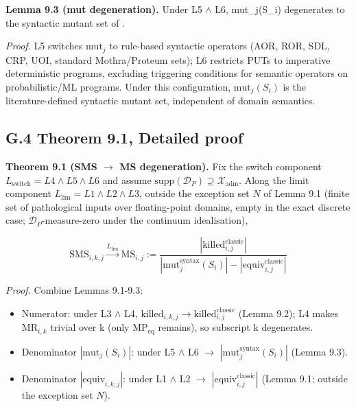 \documentclass[manuscript,screen,review]{acmart}
\begin{document}
\textbf{Lemma 9.3 (mut degeneration).} Under L5 $\wedge$ L6, mut\_j(S\_i)
degenerates to the syntactic mutant set of \citet{d7c38286734419b52de4262c9802ebdfcf4b9447}.

\emph{Proof.} L5 switches $\mathrm{mut}_j$ to rule-based syntactic operators (AOR,
ROR, SDL, CRP, UOI, standard Mothra/Proteum sets); L6 restricts PUTs
to imperative deterministic programs, excluding triggering conditions
for semantic operators on probabilistic/ML programs. Under this
configuration, $\mathrm{mut}_j(S_i)$ is the literature-defined syntactic mutant
set, independent of domain semantics.

\subsection{G.4 Theorem 9.1, Detailed proof}\label{g.4-theorem-9.1-detailed-proof}

\textbf{Theorem 9.1 (SMS $\to$ MS degeneration).} Fix the switch
component $L_{\mathrm{switch}} = L4 \wedge L5 \wedge L6$ and assume
$\mathrm{supp}(\mathcal{D}_P) \supseteq \mathcal{X}_{\mathrm{adm}}$.
Along the limit component $L_{\mathrm{lim}} = L1 \wedge L2 \wedge L3$,
outside the exception set $N$ of Lemma 9.1 (finite set of pathological
inputs over floating-point domains, empty in the exact discrete case;
$\mathcal{D}_P$-measure-zero under the continuum idealisation),

\[ \mathrm{SMS}_{i,k,j} \xrightarrow{L_{\mathrm{lim}}} \mathrm{MS}_{i,j} := \frac{|\mathrm{killed}_{i,j}^{\mathrm{classic}}|}{|\mathrm{mut}_j^{\mathrm{syntax}}(S_i)| - |\mathrm{equiv}_{i,j}^{\mathrm{classic}}|} \]

\emph{Proof.} Combine Lemmas 9.1-9.3:

\begin{itemize}

\item
  Numerator: under L3 $\wedge$ L4, $\mathrm{killed}_{i,k,j} \to
  \mathrm{killed}_{i,j}^{\mathrm{classic}}$ (Lemma 9.2); L4 makes $\mathrm{MR}_{i,k}$ trivial
  over k (only $\mathrm{MP}_{\mathrm{eq}}$ remains), so subscript k degenerates.
\item
  Denominator $|\mathrm{mut}_j(S_i)|$: under L5 $\wedge$ L6 $\to$
  $|\mathrm{mut}_j^{\mathrm{syntax}}(S_i)|$ (Lemma 9.3).
\item
  Denominator $|\mathrm{equiv}_{i,k,j}|$: under L1 $\wedge$ L2 $\to$
  $|\mathrm{equiv}_{i,j}^{\mathrm{classic}}|$ (Lemma 9.1;
  outside the exception set $N$).
\end{itemize}
\end{document}
